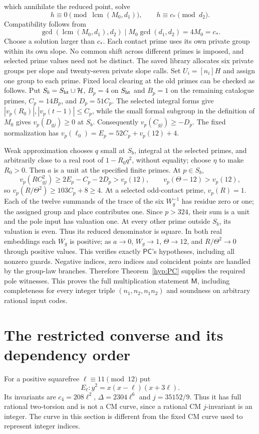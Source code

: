 \documentclass[11pt]{article}
\theoremstyle{definition}
\theoremstyle{remark}
\begin{document}
which annihilate the reduced point, solve
\[
 h\equiv0\pmod{\operatorname{lcm}(M_0,d_1)},\qquad
 h\equiv c_*\pmod{d_2}.
\]
Compatibility follows from
\[
 \gcd(\operatorname{lcm}(M_0,d_1),d_2)
                  \mid M_0\gcd(d_1,d_2)=4M_0=c_*.
\]
Choose a solution larger than $c_*$. Each contact prime uses its own
private group within its own slope. No common shift across different
primes is imposed, and selected prime values need not be distinct.
The saved library allocates six private groups per slope and twenty-seven
private slope calls. Set $U_i=[n_i]H$ and assign one group to each prime. Fixed local
clearing at the old primes can be checked as follows.
Put $S_b=S_{\rm ht}\cup\mathcal H$, $B_p=4$ on $S_{\rm ht}$ and
$B_p=1$ on the remaining catalogue primes, $C_p=14B_p$, and
$D_p=51C_p$. The selected integral forms give
$|v_p(R_0)|,|v_p(t-1)|\le C_p$, while the small formal subgroup
in the definition of $M_0$ gives $v_p(D_{gj})\ge0$ at $S_b$.
Consequently $v_p(C_{gj})\ge-D_p$. The fixed normalization has
$v_p(\ell_0)=E_p=52C_p+v_p(12)+4$.

Weak approximation chooses $q$ small at $S_b$, integral at the
selected primes, and arbitrarily close to a real root of
$1-R_0q^2$, without equality; choose $\eta$ to make $R_0>0$.
Then $a$ is a unit at the specified finite primes. At $p\in S_b$,
\[
 v_p(RC_{gj}^2)\ge 2E_p-C_p-2D_p>v_p(12),\qquad
 v_p(\Theta-12)>v_p(12),
\]
so $v_p(R/\Theta^2)\ge103C_p+8\ge4$.
At a selected odd-contact prime, $v_p(R)=1$. Each of the twelve
summands of the trace of the six $W_g^{-1}$ has residue zero or one;
the assigned group and place contributes one. Since $p>324$, their
sum is a unit and the pole input has valuation one. At every other
prime outside $S_b$, its valuation is even. Thus its reduced
denominator is square. In both real embeddings each $W_g$ is positive;
as $a\to0$, $W_g\to1$, $\Theta\to12$, and $R/\Theta^2\to0$
through positive values. This verifies exactly $\mathsf{PC}$'s
hypotheses, including all nonzero guards. Negative indices, zero indices and
coincident points are handled by the group-law branches. Therefore
Theorem~\ref{hyp:PC} supplies the required pole witnesses. This proves
the full multiplication statement $\mathsf M$, including completeness
for every integer triple $(n_1,n_2,n_1n_2)$ and soundness on arbitrary
rational input codes.



\section{The restricted converse and its dependency order}\label{sec:rc}
For a positive squarefree $\ell\equiv11\pmod {12}$ put
\[
 E_\ell:y^2=x(x-\ell)(x+3\ell).
\]
Its invariants are $c_4=208\ell^2$, $\Delta=2304\ell^6$ and
$j=35152/9$. Thus it has full rational two-torsion and is not a
CM curve, since a rational CM $j$-invariant is an integer.
The curve in this section is different from the fixed CM curve used
to represent integer indices.
\end{document}
